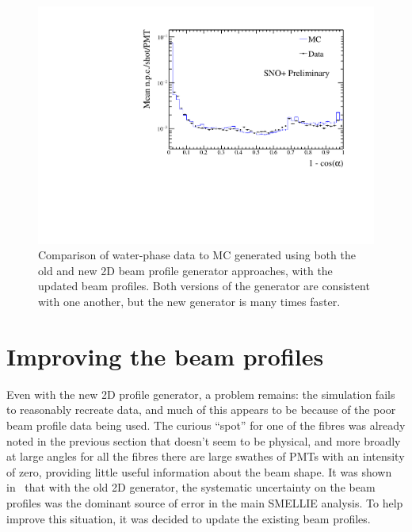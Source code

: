 \begin{figure}
    \centering
    \includegraphics[width=\linewidth]{4_SMELLIESimulation/images/data_mc_comparison_npe_vs_r_114018_109_use_f.pdf}
    \caption[Comparison of water-phase data to MC generated using both the old and new 2D beam profile generator approaches, with the updated beam profiles]{Comparison of water-phase data to MC generated using both the old and new 2D beam profile generator approaches, with the updated beam profiles. Both versions of the generator are consistent with one another, but the new generator is many times faster.}
    \label{fig:data_generator_comp_new_profiles}
\end{figure}

\section{Improving the beam profiles}\label{sect:new_beam_profiles}
Even with the new 2D profile generator, a problem remains: the simulation fails to reasonably recreate data, and much of this appears to be because of the poor beam profile data being used. The curious ``spot'' for one of the fibres was already noted in the previous section that doesn't seem to be physical, and more broadly at large angles for all the fibres there are large swathes of PMTs with an intensity of zero, providing little useful information about the beam shape. It was shown in~\cite{turner_measurement_2022} that with the old 2D generator, the systematic uncertainty on the beam profiles was the dominant source of error in the main SMELLIE analysis. To help improve this situation, it was decided to update the existing beam profiles.

